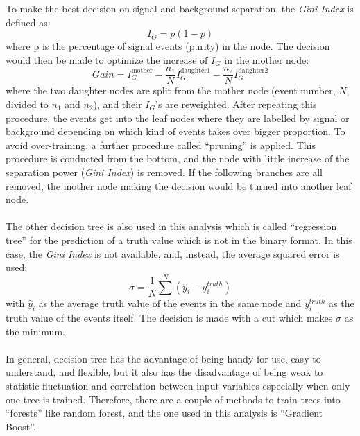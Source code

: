 To make the best decision on signal and background separation, the \textit{Gini Index} is defined as:
\begin{equation}
I_{G}= p(1-p)
\end{equation}
where p is the percentage of signal events (purity) in the node. The decision would then be made to optimize the increase of $I_{G}$ in the mother node:
\begin{equation}
Gain = I_{G}^{\text{mother}}-\frac{n_{1}}{N}I_{G}^{\text{daughter1}}-\frac{n_{2}}{N}I_{G}^{\text{daughter2}}
\end{equation} 
where the two daughter nodes are split from the mother node (event number, $N$, divided to $n_{1}$ and $n_{2}$), and their $I_{G}$'s are reweighted. After repeating this procedure, the events get into the leaf nodes where they are labelled by signal or background depending on which kind of events takes over bigger proportion. To avoid over-training, a further procedure called ``pruning'' is applied. This procedure is conducted from the bottom, and the node with little increase of the separation power (\textit{Gini Index}) is removed. If the following branches are all removed, the mother node making the decision would be turned into another leaf node. 
\\
\\The other decision tree is also used in this analysis which is called ``regression tree'' for the prediction of a truth value which is not in the binary format. In this case, the \textit{Gini Index} is not available, and, instead, the average squared error is used:
\begin{equation}
\sigma = \frac{1}{N}\sum^{N}(\hat{y}_i-y^{truth}_i)
\end{equation}
with $\hat{y}_i$ as the average truth value of the events in the same node and $y^{truth}_i$ as the truth value of the events itself. The decision is made with a cut which makes $\sigma$ as the minimum.
\\ 
\\In general, decision tree has the advantage of being handy for use, easy to understand, and flexible, but it also has the disadvantage of being weak to statistic fluctuation and correlation between input variables especially when only one tree is trained. Therefore, there are a couple of methods to train trees into ``forests'' like random forest, and the one used in this analysis is ``Gradient Boost''.
\\
\\
\\
